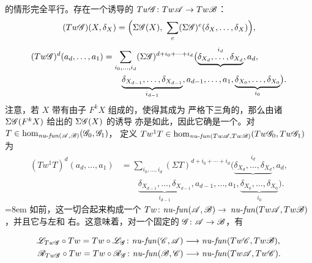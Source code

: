 \trTwistedComplex{}的情形完全平行。存在一个诱导的\trNonunital{} \trAFunctor{}%
$Tw\mathscr{G}\colon Tw\mathscr{A}\to Tw\mathscr{B}$：
\begin{equation*}
(Tw\scr{G})(X,\delta_X)
=\Bigl(\Sigma\scr{G}(X),\ \sum_e(\Sigma\scr{G})^e(\delta_X,\ldots,\delta_X)\Bigr),
\end{equation*}
\begin{equation*}
\begin{split}
(Tw\mathscr{G})^d(a_d,\ldots,a_1)
&=\sum_{i_0,\ldots,i_d}(\Sigma\mathscr{G})^{d+i_0+\cdots+i_d}\bigl(
\underbrace{\delta_{X_d},\ldots,\delta_{X_d}}^{i_d},a_d,\\
&\qquad \underbrace{\delta_{X_{d-1}},\ldots,\delta_{X_{d-1}}}_{i_{d-1}},
a_{d-1},\ldots,a_1,
\underbrace{\delta_{X_0},\ldots,\delta_{X_0}}_{i_0}\bigr).
\end{split}
\end{equation*}
注意，若 $X$ 带有由子\trComplex{} $F^kX$ 组成的\trFiltration，使得其\trDifferential{}成为
严格下三角的，那么由诸 $\Sigma\mathscr{G}(F^kX)$ 给出的 $\Sigma\mathscr{G}(X)$ 的诱导%
\trFiltration{}亦是如此，因此它确是一个\trTwistedComplex。对
$T\in\hom_{\mathit{nu}\text{-}\mathit{fun}(\mathscr{A},\mathscr{B})}(\mathscr{G}_0,\mathscr{G}_1)$，
定义
$Tw^1T\in\hom_{\mathit{nu}\text{-}\mathit{fun}(Tw\mathscr{A},Tw\mathscr{B})}
(Tw\mathscr{G}_0,Tw\mathscr{G}_1)$ 为
\begin{equation}\label{eq:tw1-map}
\begin{split}
(Tw^1T)^d(a_d,\ldots,a_1)
&=\sum_{i_0,\ldots,i_d}(\Sigma T)^{d+i_0+\cdots+i_d}\bigl(
\underbrace{\delta_{X_d},\ldots,\delta_{X_d}}^{i_d},a_d,\\
&\qquad \underbrace{\delta_{X_{d-1}},\ldots,\delta_{X_{d-1}}}_{i_{d-1}},
a_{d-1},\ldots,a_1,
\underbrace{\delta_{X_0},\ldots,\delta_{X_0}}_{i_0}\bigr).
\end{split}
\end{equation}
\begingroup\emergencystretch=8em
如前，这一切合起来构成一个\trNonunital{} \trAFunctor{}%
$Tw\colon\mathit{nu}\text{-}\mathit{fun}(\mathscr{A},\mathscr{B})\to$
$\mathit{nu}\text{-}\mathit{fun}(Tw\mathscr{A},Tw\mathscr{B})$，并且它与左\trComposition{}和
右\trComposition{}\trCompatible。这意味着，对一个固定的 $\mathscr{G}\colon\mathscr{A}\to\mathscr{B}$，有
\par\endgroup
\begin{equation}\label{eq:tw-left-right-composition}
\begin{aligned}
\mathscr{L}_{Tw\mathscr{G}}\circ Tw=Tw\circ\mathscr{L}_{\mathscr{G}}\colon
\mathit{nu}\text{-}\mathit{fun}(\mathscr{C},\mathscr{A})
&\longrightarrow\mathit{nu}\text{-}\mathit{fun}(Tw\mathscr{C},Tw\mathscr{B}),\\
\mathscr{R}_{Tw\mathscr{G}}\circ Tw=Tw\circ\mathscr{R}_{\mathscr{G}}\colon
\mathit{nu}\text{-}\mathit{fun}(\mathscr{B},\mathscr{C})
&\longrightarrow\mathit{nu}\text{-}\mathit{fun}(Tw\mathscr{A},Tw\mathscr{C}).
\end{aligned}
\end{equation}

